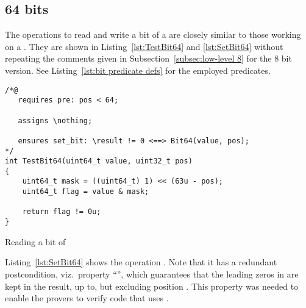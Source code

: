 \FloatBarrier

\subsection{64 bits}
\label{subsec:low-level 64}



The operations to read and write a bit of a 
are closely similar to
those working on a .
%
They are shown in Listing~\ref{lst:TestBit64}
and \ref{lst:SetBit64} without repeating the comments given
in Subsection~\ref{subsec:low-level 8} for the 8 bit version.
%
See Listing~\ref{lst:bit predicate defs} for the employed \acsl predicates.





\begin{listing}[hbt]
\begin{minipage}{0.99\textwidth}
\begin{lstlisting}[style=acsl-block]
/*@
   requires pre: pos < 64;

   assigns \nothing;

   ensures set_bit: \result != 0 <==> Bit64(value, pos);
*/
int TestBit64(uint64_t value, uint32_t pos)
{
    uint64_t mask = ((uint64_t) 1) << (63u - pos);
    uint64_t flag = value & mask;

    return flag != 0u;
}
\end{lstlisting}
\end{minipage}
\caption{\label{lst:TestBit64}Reading a bit of }
\end{listing}








Listing~\ref{lst:SetBit64} shows the operation .
%
Note that it has a redundant postcondition, viz.\ property
``'', which guarantees that the leading zeros in
 are kept in the result, up to, but excluding
position .
%
This property was needed to enable the provers to verify code that uses
.




